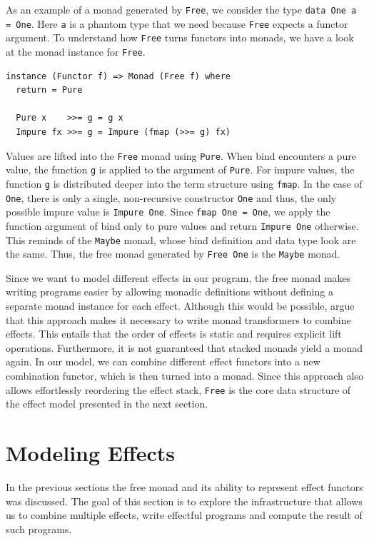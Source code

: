 \documentclass[a4paper, 11pt, fleqn, twoside]{scrreprt}
\newcommand{\hinl}[1]{\texttt{#1}}
\newcommand{\cinl}[1]{\texttt{#1}}
\begin{document}
As an example of a monad generated by \cinl{Free}, we consider the type \hinl{data One a = One}.
Here \hinl{a} is a phantom type that we need because \hinl{Free} expects a functor argument.
To understand how \cinl{Free} turns functors into monads, we have a look at the monad instance for \hinl{Free}.

\begin{verbatim}
instance (Functor f) => Monad (Free f) where
  return = Pure

  Pure x    >>= g = g x
  Impure fx >>= g = Impure (fmap (>>= g) fx)
\end{verbatim}

Values are lifted into the \cinl{Free} monad using \cinl{Pure}.
When bind encounters a pure value, the function \hinl{g} is applied to the argument of \hinl{Pure}.
For impure values, the function \hinl{g} is distributed deeper into the term structure using \hinl{fmap}.
In the case of \hinl{One}, there is only a single, non-recursive constructor \hinl{One} and thus, the only possible impure value is \hinl{Impure One}.
Since \hinl{fmap One = One}, we apply the function argument of bind only to pure values and return \cinl{Impure One} otherwise.
This reminds of the \hinl{Maybe} monad, whose bind definition and data type look are the same.
Thus, the free monad generated by \hinl{Free One} is the \hinl{Maybe} monad.


Since we want to model different effects in our program, the free monad makes writing programs easier by allowing monadic definitions without defining a separate monad instance for each effect.
Although this would be possible, \citet{kammar2013handlers} argue that this approach makes it necessary to write monad transformers to combine effects.
This entails that the order of effects is static and requires explicit lift operations.
Furthermore, it is not guaranteed that stacked monads yield a monad again.
In our model, we can combine different effect functors into a new combination functor, which is then turned into a monad.
Since this approach also allows effortlessly reordering the effect stack, \hinl{Free} is the core data structure of the effect model presented in the next section.

\section{Modeling Effects}
In the previous sections the free monad and its ability to represent effect functors was discussed.
The goal of this section is to explore the infrastructure that allows us to combine multiple effects, write effectful programs and compute the result of such programs.
\end{document}
